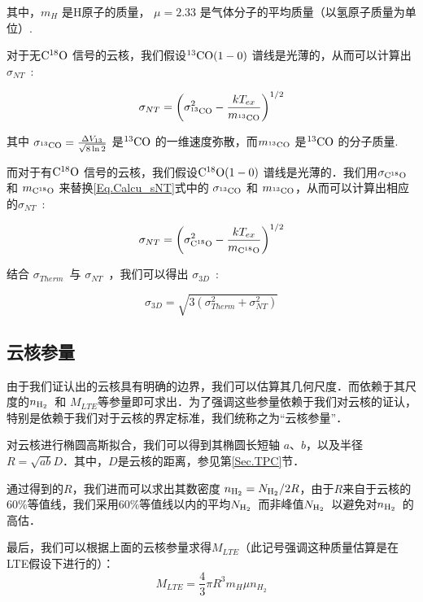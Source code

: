 \documentclass[UTF8, nocolorlinks]{pkuthss}
\newcommand{\cob}{$\rm ^{13}CO$ }
\newcommand{\coc}{$\rm C^{18}O$ }
\newcommand{\cobb}{$\rm^{13}CO(1-0)$ }
\newcommand{\cocc}{$\rm C^{18}O(1-0)$ }
\newcommand{\nhyd}{$N_{\rm H_2}$\ }
\newcommand{\nnhyd}{$n_{\rm H_2}$\ }
\newcommand{\sigmath}{$\sigma _{Therm}$\ }
\newcommand{\sigmant}{$\sigma _{NT}$\ }
\newcommand{\sigmatd}{$\sigma _{3D}$\ }
\begin{document}
      		其中，$m_H$ 是H原子的质量， $\mu=2.33 $ 是气体分子的平均质量\supercite{2008A&A...487..993K}（以氢原子质量为单位）. 

      		对于无\coc 信号的云核，我们假设\cobb 谱线是光薄的，从而可以计算出\sigmant :

      		\begin{equation}\label{Eq.Calcu_sNT}
      		   \sigma_{NT}=\left(\sigma ^2 _{^{13}{\rm CO}}- \frac{kT_{ex}}{m_{^{13}{\rm CO}}} \right)^{		1/2}
      		\end{equation}

      		其中 $\sigma _{^{13}{\rm CO}} = \frac{\Delta V_{13}}{\sqrt{8\ln2}}$ 是\cob 的一维速度弥散，而$m_{^{13}{\rm CO}}$ 是\cob 的分子质量.

      		而对于有\coc 信号的云核，我们假设\cocc 谱线是光薄的．我们用$\sigma _{\rm C^{18}O}$ 和 $m_{\rm C^{18}O}$ 来替换\ref{Eq.Calcu_sNT}式中的 $\sigma_{^{13}{\rm CO}}$ 和 ${m_{^{13}{\rm CO}}}$，从而可以计算出相应的\sigmant :

      		 \begin{equation}\label{Eq.Calcu_sNT2}
      		   \sigma_{NT}=\left(\sigma ^2 _{{\rm C^{18}O}}- \frac{kT_{ex}}{m_{{\rm C^{18}O}}} \right)^{		1/2}
      		\end{equation}
		
      		结合 \sigmath 与 \sigmant ，我们可以得出 \sigmatd :

      		\begin{equation}
      		   \sigma_{3D}=\sqrt{3(\sigma _{Therm}^2+\sigma _{NT}^2)}
      		\end{equation}

		\subsection{云核参量}

			由于我们证认出的云核具有明确的边界，我们可以估算其几何尺度．而依赖于其尺度的\nnhyd 和 $M_{LTE}$等参量即可求出．为了强调这些参量依赖于我们对云核的证认，特别是依赖于我们对于云核的界定标准，我们统称之为“云核参量”．

			对云核进行椭圆高斯拟合，我们可以得到其椭圆长短轴 $a$、$b$，以及半径$R=\sqrt{ab}D$．其中，$D$是云核的距离，参见第\ref{Sec.TPC}节．

			通过得到的$R$，我们进而可以求出其数密度 $n_{\rm H_2}=N_{\rm H_2} /2R$，由于$R$来自于云核的60\%等值线，我们采用60\%等值线以内的平均\nhyd 而非峰值\nhyd 以避免对\nnhyd 的高估．
			
			最后，我们可以根据上面的云核参量求得$M_{LTE}$（此记号强调这种质量估算是在LTE假设下进行的）：
			\begin{equation}
        	 M_{LTE}=\frac{4}{3}\pi R^3 m_H \mu n_{H_2}
      		\end{equation}
\end{document}
